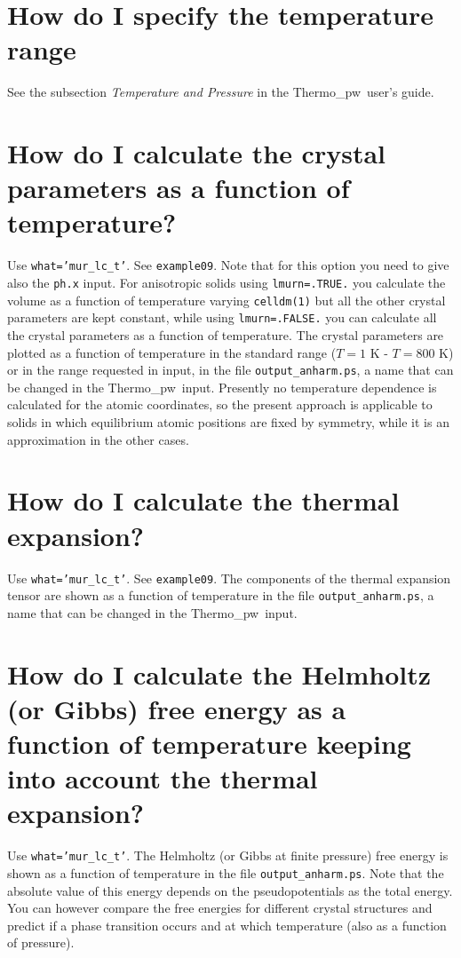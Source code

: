 \documentclass[12pt,a4paper,twoside]{report}
\def\thermo{{\sc Thermo}\_{\sc pw}}
\begin{document}
\newpage
{\color{coral}\section{How do I specify the temperature range}} 
\color{black}
See the subsection {\it Temperature and Pressure} in the 
\thermo\ user's guide. 

\newpage
{\color{coral}\section{How do I calculate the crystal parameters as a function
of temperature?}}
\color{black}
Use \texttt{what='mur\_lc\_t'}. See \texttt{example09}. Note that
for this option you need to give also the \texttt{ph.x} input.
For anisotropic solids using \texttt{lmurn=.TRUE.} you calculate 
the volume as a function of temperature varying \texttt{celldm(1)} 
but all the other crystal parameters are kept constant, while
using \texttt{lmurn=.FALSE.} you can calculate all the crystal
parameters as a function of temperature.
The crystal parameters are plotted as a function of temperature
in the standard range ($T=1$ K - $T=800$ K) or in the range  
requested in input, in the file 
\texttt{output\_anharm.ps}, a name that can be changed in the \thermo\ input.
Presently no temperature dependence is calculated 
for the atomic coordinates, so the present approach is applicable
to solids in which equilibrium atomic positions are fixed by 
symmetry, while it is an approximation in the other cases.

\newpage
{\color{coral}\section{How do I calculate the thermal expansion?}}
\color{black}
Use \texttt{what='mur\_lc\_t'}. See \texttt{example09}. The components
of the thermal expansion tensor are shown as a function of temperature 
in the file \texttt{output\_anharm.ps}, a name that can be changed in 
the \thermo\ input.

\newpage
{\color{coral}\section{How do I calculate the Helmholtz (or Gibbs) free energy
as a function of temperature keeping into account the thermal expansion?}}
\color{black}
Use \texttt{what='mur\_lc\_t'}. The Helmholtz (or Gibbs at finite pressure) 
free energy is shown as a function of temperature in the file 
\texttt{output\_anharm.ps}. Note that the absolute value of this energy
depends on the pseudopotentials as the total energy. You can however
compare the free energies for different crystal structures 
and predict if a phase transition occurs and at which temperature (also 
as a function of pressure).
\end{document}
